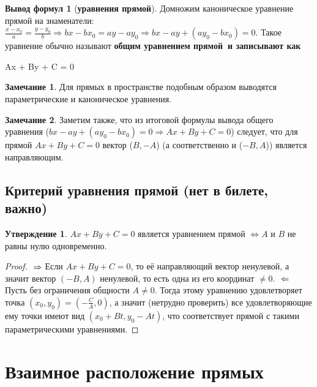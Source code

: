 \documentclass[a4paper, 12pt]{article}
\theoremstyle{definition}
\newtheorem*{subtheorem}{Утверждение}
\newtheorem*{formulas}{Вывод формул}
\newtheorem*{remark}{Замечание}
\newenvironment{boxedalign*}
  {\begin{equation*}\begin{lrbox}{\boxedalignbox}$\begin{aligned}}
  {\end{aligned}$\end{lrbox}\fbox{\usebox{\boxedalignbox}}\end{equation*}}
\begin{document}
\begin{formulas}[\bfseries уравнения прямой\mdseries]
		Домножим каноническое уравнение прямой на знаменатели: $\frac{x-x_{0}}{a} = \frac{y-y_{0}}{b} \Rightarrow bx-bx_{0}=ay-ay_{0} \Rightarrow bx - ay + (ay_{0}-bx_{0}) = 0$. Такое уравнение обычно называют \bfseries общим уравнением прямой\mdseries \ и записывают как \begin{boxedalign*}Ax + By + C = 0\end{boxedalign*}
	\end{formulas}
	\begin{remark}
		Для прямых в пространстве подобным образом выводятся параметрические и каноническое уравнения. 
	\end{remark}
	\begin{remark}
		Заметим также, что из итоговой формулы вывода общего уравнения ($bx - ay + (ay_{0}-bx_{0}) = 0 \Rightarrow Ax + By + C = 0$) следует, что для прямой $Ax + By +C = 0$ вектор ($B, -A$) (а соответственно и ($-B, A$)) является направляющим.
	\end{remark}
	\subsection{Критерий уравнения прямой (нет в билете, важно)}
	\begin{subtheorem}
		$Ax + By + C = 0$ является уравнением прямой $\Leftrightarrow A$ и $B$ не равны нулю одновременно.
	\end{subtheorem}
	\begin{proof}
		$\\ \Rightarrow$ Если $Ax + By + C = 0$, то её направляющий вектор ненулевой, а значит вектор $(-B, A)$ ненулевой, то есть одна из его координат $\neq 0$.
		$\\ \Leftarrow$ Пусть без ограничения общности $A \neq 0$. Тогда этому уравнению удовлетворяет точка $(x_{0}, y_{0}) = (-\frac{C}{A}, 0)$, а значит (нетрудно проверить) все удовлетворяющие ему точки имеют вид $(x_{0} + Bt, y_{0} - At)$, что соответствует прямой с такими параметрическими уравнениями.
	\end{proof}
	\section{Взаимное расположение прямых}
\end{document}
